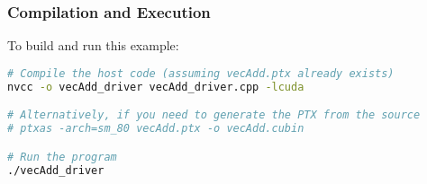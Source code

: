\subsubsection{Compilation and Execution}

To build and run this example:

\begin{lstlisting}[language=bash]
# Compile the host code (assuming vecAdd.ptx already exists)
nvcc -o vecAdd_driver vecAdd_driver.cpp -lcuda

# Alternatively, if you need to generate the PTX from the source
# ptxas -arch=sm_80 vecAdd.ptx -o vecAdd.cubin

# Run the program
./vecAdd_driver
\end{lstlisting}

